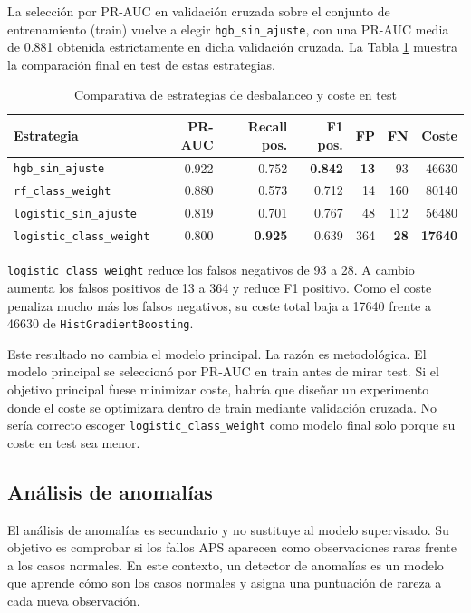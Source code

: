 \documentclass[11pt,a4paper]{article}
\begin{document}
La selección por PR-AUC en validación cruzada sobre el conjunto de entrenamiento (train) vuelve a elegir \texttt{hgb\_sin\_ajuste}, con una PR-AUC media de 0.881 obtenida estrictamente en dicha validación cruzada. La Tabla \ref{tab_coste} muestra la comparación final en test de estas estrategias.

\begin{table}[H]
\centering
\caption{Comparativa de estrategias de desbalanceo y coste en test}
\label{tab_coste}
\small
\begin{tabular}{@{}lrrrrrr@{}}
\toprule
\textbf{Estrategia} & \textbf{PR-AUC} & \textbf{Recall pos.} & \textbf{F1 pos.} & \textbf{FP} & \textbf{FN} & \textbf{Coste}\\
\midrule
\rowcolor{bestrow} \texttt{hgb\_sin\_ajuste} & 0.922 & 0.752 & \textbf{0.842} & \textbf{13} & 93 & 46630\\
\texttt{rf\_class\_weight} & 0.880 & 0.573 & 0.712 & 14 & 160 & 80140\\
\texttt{logistic\_sin\_ajuste} & 0.819 & 0.701 & 0.767 & 48 & 112 & 56480\\
\rowcolor{altrow} \texttt{logistic\_class\_weight} & 0.800 & \textbf{0.925} & 0.639 & 364 & \textbf{28} & \textbf{17640}\\
\bottomrule
\end{tabular}
\end{table}

\texttt{logistic\_class\_weight} reduce los falsos negativos de 93 a 28. A cambio aumenta los falsos positivos de 13 a 364 y reduce F1 positivo. Como el coste penaliza mucho más los falsos negativos, su coste total baja a 17640 frente a 46630 de \texttt{HistGradientBoosting}.

Este resultado no cambia el modelo principal. La razón es metodológica. El modelo principal se seleccionó por PR-AUC en train antes de mirar test. Si el objetivo principal fuese minimizar coste, habría que diseñar un experimento donde el coste se optimizara dentro de train mediante validación cruzada. No sería correcto escoger \texttt{logistic\_class\_weight} como modelo final solo porque su coste en test sea menor.

\subsection{Análisis de anomalías}
\label{sec_anomalias}

El análisis de anomalías es secundario y no sustituye al modelo supervisado. Su objetivo es comprobar si los fallos APS aparecen como observaciones raras frente a los casos normales. En este contexto, un detector de anomalías es un modelo que aprende cómo son los casos normales y asigna una puntuación de rareza a cada nueva observación.
\end{document}
